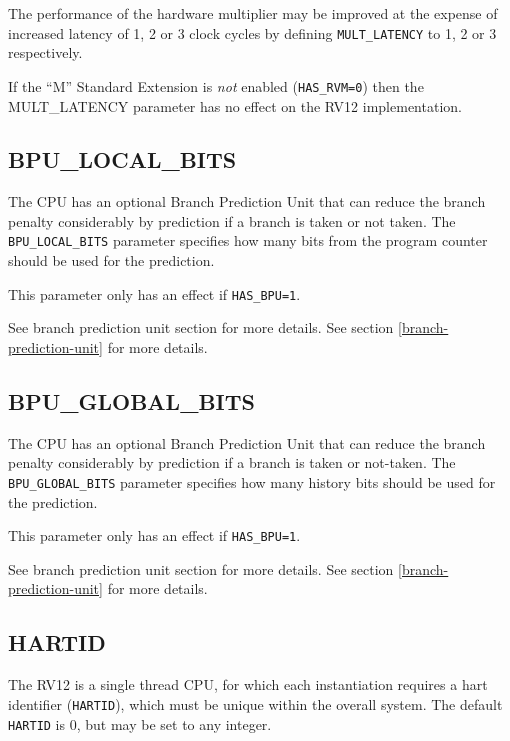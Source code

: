 The performance of the hardware multiplier may be improved at the expense of
increased latency of 1, 2 or 3 clock cycles by defining \texttt{MULT\_LATENCY}
to 1, 2 or 3 respectively.

If the ``M'' Standard Extension is \emph{not} enabled (\texttt{HAS\_RVM=0})
then the MULT\_LATENCY parameter has no effect on the RV12
implementation.

\subsection{BPU\_LOCAL\_BITS}\label{bpu_local_bits}

The CPU has an optional Branch Prediction Unit that can reduce the branch
penalty considerably by prediction if a branch is taken or not taken. The
\texttt{BPU\_LOCAL\_BITS} parameter specifies how many bits from the program
counter should be used for the prediction.

This parameter only has an effect if \texttt{HAS\_BPU=1}.

\ifdefined\MARKDOWN
See branch prediction unit section for more details.
\else
See section \ref{branch-prediction-unit}  for more details.
\fi

\subsection{BPU\_GLOBAL\_BITS}\label{bpu_global_bits}

The CPU has an optional Branch Prediction Unit that can reduce the branch
penalty considerably by prediction if a branch is taken or not-taken. The
\texttt{BPU\_GLOBAL\_BITS} parameter specifies how many history bits should be
used for the prediction.

This parameter only has an effect if \texttt{HAS\_BPU=1}.

\ifdefined\MARKDOWN
See branch prediction unit section for more details.
\else
See section \ref{branch-prediction-unit}  for more details.
\fi

\subsection{HARTID}\label{hartid}

The RV12 is a single thread CPU, for which each instantiation requires a hart
identifier (\texttt{HARTID}), which must be unique within the overall system.
The default \texttt{HARTID} is 0, but may be set to any integer.

